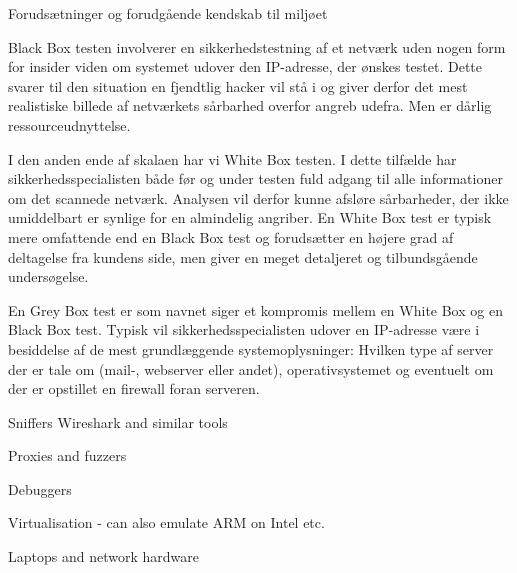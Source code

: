 \documentclass[Screen16to9,17pt]{foils}
\begin{document}

\begin{list2}
\item Forudsætninger og forudgående kendskab til miljøet
\item Black Box testen involverer en sikkerhedstestning af et netværk uden
nogen form for insider viden om systemet udover den IP-adresse, der
ønskes testet. Dette svarer til den situation en fjendtlig hacker vil
stå i og giver derfor det mest realistiske billede af netværkets
sårbarhed overfor angreb udefra. Men er dårlig ressourceudnyttelse.
\item I den anden ende  af skalaen har vi White Box testen. I dette tilfælde
har sikkerhedsspecialisten både før og under testen fuld adgang til
alle informationer om det scannede netværk. Analysen vil derfor kunne
afsløre sårbarheder, der ikke umiddelbart er synlige for en almindelig
angriber. En White Box test er typisk mere omfattende end en Black Box
test og forudsætter en højere grad af deltagelse fra kundens side, men
giver en meget detaljeret og tilbundsgående undersøgelse.

\item En Grey Box test er som navnet siger et kompromis mellem en White Box
og en Black Box test. Typisk vil sikkerhedsspecialisten udover en
IP-adresse være i besiddelse af de mest grundlæggende
systemoplysninger: Hvilken type af server der er tale om (mail-,
webserver eller andet), operativsystemet og eventuelt om der er
opstillet en firewall foran serveren.
\end{list2}




\begin{list2}
\item Sniffers Wireshark and similar tools
\item Proxies and fuzzers
\item Debuggers
\item Virtualisation - can also emulate ARM on Intel etc.
\item Laptops and network hardware
\end{list2}



\slidenext{}
\end{document}
